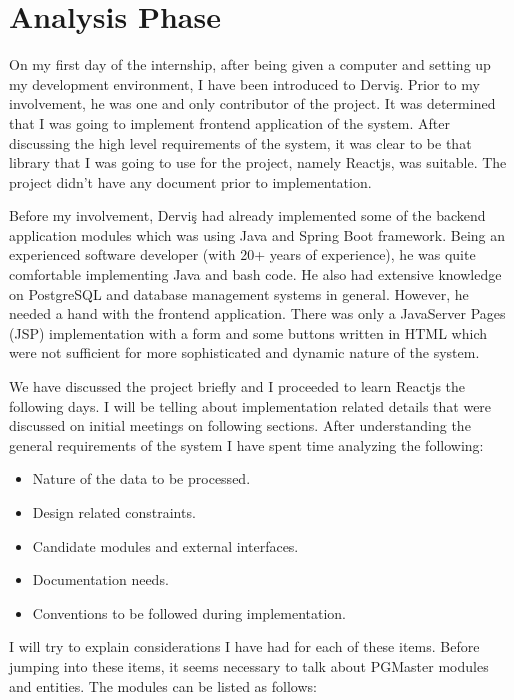\section{Analysis Phase}
On my first day of the internship, after being given a computer and setting up 
my development environment, I have been introduced to Derviş. Prior to my 
involvement, he was one and only contributor of the project. It was determined 
that I was going to implement frontend application of the system. After 
discussing the high level requirements of the system, it was clear to be that 
library that I was going to use for the project, namely Reactjs, was suitable. 
The project didn't have any document prior to implementation.
\par
Before my involvement, Derviş had already implemented some of the backend 
application modules which was using Java and Spring Boot framework. Being an 
experienced software developer (with 20+ years of experience), he was quite 
comfortable implementing Java and bash code. He also had extensive knowledge 
on PostgreSQL and database management systems in general. However, he needed 
a hand with the frontend application. There was only a JavaServer Pages (JSP) 
implementation with a form and some buttons written in HTML which were not 
sufficient for more sophisticated and dynamic nature of the system.
\par
We have discussed the project briefly and I proceeded to learn Reactjs the 
following days. I will be telling about implementation related details that 
were discussed on initial meetings on following sections. After understanding 
the general requirements of the system I have spent time analyzing the 
following:
\begin{itemize}
    \item Nature of the data to be processed.
    \item Design related constraints.
    \item Candidate modules and external interfaces.
    \item Documentation needs.
    \item Conventions to be followed during implementation.
\end{itemize}

I will try to explain considerations I have had for each of these items. 
Before jumping into these items, it seems necessary to talk about PGMaster 
modules and entities. The modules can be listed as follows:

